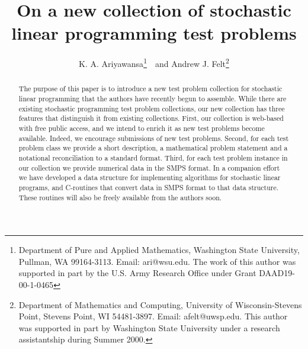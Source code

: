 \documentclass[11pt,letterpaper]{article}
\title{On a new collection of stochastic linear programming test
problems}
\author{K. A. Ariyawansa\thanks{Department of
Pure and Applied Mathematics, Washington State University,
Pullman, WA 99164-3113. Email: ari@wsu.edu. The work of this
author was supported in part by the U.S. Army Research Office
under Grant DAAD19-00-1-0465}\ \ and Andrew J.
Felt\thanks{Department of Mathematics and Computing,
University of Wisconsin-Stevens Point, Stevens Point, WI 54481-3897.
Email: afelt@uwsp.edu. This author was supported in part by
Washington State University under a research assistantship
during Summer 2000.}}
\begin{document}
\maketitle
\begin{abstract}
The purpose of this paper is to introduce a new test
problem collection for stochastic linear programming
that the authors have recently begun to assemble.
While there are existing stochastic programming
test problem collections, our new collection has
three features that distinguish it from existing
collections. First, our collection is web-based with
free public access, and we intend to enrich it as new test
problems become available. Indeed, we encourage submissions
of new test problems. Second,
for each test problem class we provide a short description,
a mathematical problem statement and a notational reconciliation
to a standard format. Third, for each test problem instance
in our collection we provide numerical data in the SMPS \cite{SMPS87}
format. In a companion effort we have developed a data
structure for implementing algorithms for stochastic
linear programs, and C-routines that convert data in SMPS format
to that data structure. 
These routines will also be freely available
from the authors soon.
\end{abstract}

%
%
%
%
%
%
%
%
%
%
%
%
%



\end{document}
